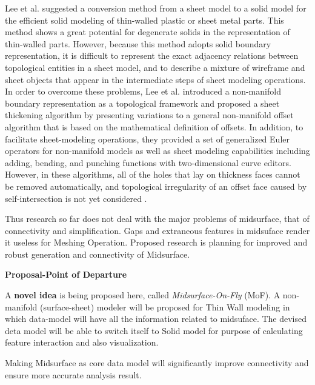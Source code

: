 \documentclass[a4paper]{article}
\begin{document}
Lee et al. \cite{Lee1995} suggested a conversion method from a sheet model to a solid model for the efficient solid modeling of thin-walled plastic or sheet metal parts. This method shows a great potential for degenerate solids in the representation of thin-walled parts. However, because this method adopts solid boundary representation, it is difficult to represent
the exact adjacency relations between topological entities in a sheet model, and to describe a mixture of wireframe and sheet objects that appear in the intermediate steps of sheet modeling operations. In order to overcome these problems, Lee et al. \cite{Lee2001} introduced a non-manifold boundary representation as a topological framework and proposed
a sheet thickening algorithm by presenting variations to a general non-manifold offset algorithm that is based on the mathematical definition of offsets. In addition, to facilitate sheet-modeling operations,  they provided a set of generalized Euler operators for non-manifold models as well as sheet modeling capabilities including adding, bending, and punching functions with two-dimensional curve editors. However, in these algorithms, all of the holes that lay
on thickness faces cannot be removed automatically, and topological irregularity of an offset face caused by self-intersection is not yet considered \cite{Lee2001}.

Thus research so far does not deal with the major problems of midsurface, that of connectivity and simplification. Gaps and extraneous features in midsuface render it useless for Meshing Operation. Proposed research is planning for improved and robust generation and connectivity of Midsurface\cite{Sheen2008}.

\vskip5mm


\textbf{Proposal-Point of Departure}

A \textbf{novel idea} is being proposed here, called \emph{Midsurface-On-Fly} (MoF). 
A non-manifold (surface-sheet) modeler will be proposed for Thin Wall modeling in which data-model will have all the information related to midsuface. The devised deta model will be able to switch itself to Solid model for purpose of calculating feature interaction and also visualization.

Making Midsurface as core data model will significantly improve connectivity and ensure more accurate analysis result.
\end{document}
